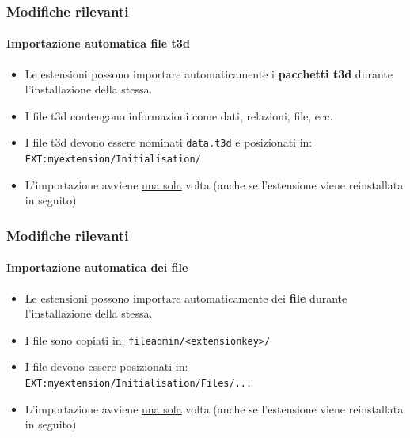 
\begin{frame}[fragile]
	\frametitle{Modifiche rilevanti}
	\framesubtitle{Importazione automatica file t3d}

	\begin{itemize}
		\item Le estensioni possono importare automaticamente i \textbf{pacchetti t3d} \newline
			durante l'installazione della stessa.
		\item I file t3d contengono informazioni come dati, relazioni, file, ecc.
		\item I file t3d devono essere nominati \texttt{data.t3d} e posizionati in:\newline
			\texttt{EXT:myextension/Initialisation/}

		\item L'importazione avviene \underline{una sola} volta\newline
			(anche se l'estensione viene reinstallata in seguito)

	\end{itemize}

\end{frame}


\begin{frame}[fragile]
	\frametitle{Modifiche rilevanti}
	\framesubtitle{Importazione automatica dei file}

	\begin{itemize}
		\item Le estensioni possono importare automaticamente dei \textbf{file}\newline
			durante l'installazione della stessa.
		\item I file sono copiati in:\newline
			\texttt{fileadmin/<extensionkey>/}
		\item I file devono essere posizionati in:\newline
			\texttt{EXT:myextension/Initialisation/Files/...}

		\item L'importazione avviene \underline{una sola} volta\newline
			(anche se l'estensione viene reinstallata in seguito)

	\end{itemize}

\end{frame}

